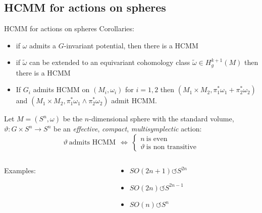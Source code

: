 \documentclass[handout,10pt]{beamer}
\newcommand{\cmark}{\textcolor{green}{\ding{51}}}%
\newcommand{\xmark}{\textcolor{red}{\ding{55}}}%
\begin{document}
\subsection{HCMM for actions on spheres}
\begin{frame}{HCMM for actions on spheres}
	Corollaries:
	\begin{itemize}
		\item if $\omega$ admits a $G$-invariant potential, then there is a HCMM
		\item if $\tilde{\omega}$ can be extended to an equivariant cohomology class $\tilde{\omega}\in H_g^{k+1}(M)$ then there is a HCMM
		\item If $G_i$ admits HCMM on $(M_i,\omega_i)$ for $i=1,2$ then $(M_1\times M_2, \pi_1^\ast \omega_1 + \pi_2^\ast \omega_2)$ and $(M_1\times M_2, \pi_1^\ast \omega_1 \wedge \pi_2^\ast \omega_2)$ admit HCMM.
	\end{itemize}
	\vfill
	\pause
	\begin{thmblock}
		Let $M= (S^n,\omega)$ be the $n$-dimensional sphere with the standard volume,
		\\
		$\vartheta:G\times S^n \to S^n$ be an \emph{effective}, \emph{compact}, \emph{multisymplectic} action:
		\vspace{-.5em}
		\begin{displaymath}
			\vartheta ~\text{admits HCMM}~ ~\Longleftrightarrow~ 
			\begin{cases}
				n ~\text{is even}~
				\\
				\vartheta ~\text{is non transitive}
			\end{cases}					
		\end{displaymath}
	\end{thmblock}	
	\pause
	\begin{columns}[T]
		\begin{column}{.2\linewidth}
			Examples:
		\end{column}
		\begin{column}{.6\linewidth}
			\begin{itemize}
				\item[\cmark] $SO(2n+1) \circlearrowleft S^{2n}$
				\item[\xmark] $SO(2n) \circlearrowleft S^{2n-1}$
				\item[\cmark] $SO(n) \circlearrowleft S^{n}$
			\end{itemize}				
		\end{column}
	\end{columns}



\end{frame}
\end{document}
